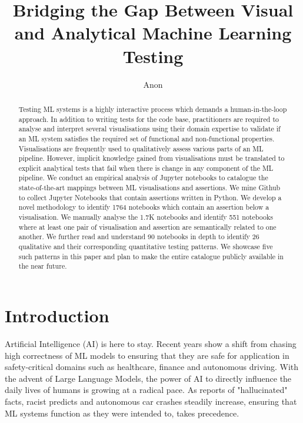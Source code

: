 \documentclass[acmsmall,screen,review,anonymous]{acmart}
\begin{document}
\title{Bridging the Gap Between Visual and Analytical Machine Learning Testing}

\author{Anon}

\begin{abstract}
Testing ML systems is a highly interactive process which demands a human-in-the-loop approach. In addition to writing tests for the code base, practitioners are required to analyse and interpret several visualisations using their domain expertise to validate if an ML system satisfies the required set of functional and non-functional properties. Visualisations are frequently used to qualitatively assess various parts of an ML pipeline. However, implicit knowledge gained from visualisations must be translated to explicit analytical tests that fail when there is change in any component of the ML pipeline. We conduct an empirical analysis of Jupyter notebooks to catalogue the state-of-the-art mappings between ML visualisations and assertions. We mine Github to collect Jupyter Notebooks that contain assertions written in Python. We develop a novel methodology to identify 1764 notebooks which contain an assertion below a visualisation. We manually analyse the 1.7K notebooks and identify 551 notebooks where at least one pair of visualisation and assertion are semantically related to one another. We further read and understand 90 notebooks in depth to identify 26 qualitative and their corresponding quantitative testing patterns. We showcase five such patterns in this paper and plan to make the entire catalogue publicly available in the near future.

\end{abstract}

\maketitle

\section{Introduction}\label{sec:intro}
Artificial Intelligence (AI) is here to stay. Recent years show a shift from chasing high correctness of ML models to ensuring that they are safe for application in safety-critical domains such as healthcare, finance and autonomous driving. With the advent of Large Language Models, the power of AI to directly influence the daily lives of humans is growing at a radical pace. As reports of "hallucinated" facts, racist predicts and autonomous car crashes steadily increase, ensuring that ML systems function as they were intended to, takes precedence.
\end{document}
